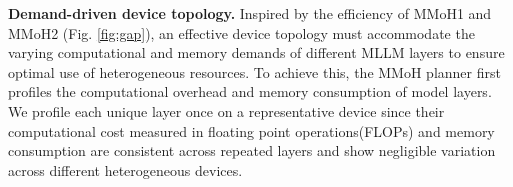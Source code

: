 \documentclass[conference]{IEEEtran}
\begin{document}
\textbf{Demand-driven device topology.}
Inspired by the efficiency of MMoH1 and MMoH2 (Fig. \ref{fig:gap}), an effective device topology must accommodate the varying computational and memory demands of different MLLM layers to ensure optimal use of heterogeneous resources.
To achieve this, the MMoH planner first profiles the computational overhead and memory consumption of model layers.
We profile each unique layer once on a representative device since their computational cost measured in floating point operations(FLOPs) and memory consumption are consistent across repeated layers and show negligible variation across different heterogeneous devices.
\end{document}
